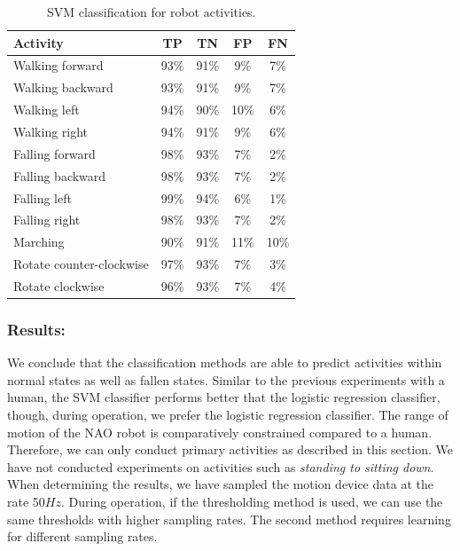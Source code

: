 \documentclass[letterpaper]{article}
\begin{document}
\begin{sloppy}
\begin{table}[!ht]
\caption{SVM classification for robot activities.}
	\label{tab:robot-svm-class}
	\centering
		\begin{tabular} {| l | c | c | c | c | }
		\hline
			{\bf Activity} & {\bf  TP}  &	{\bf TN}  &	{\bf FP} &	{\bf FN} \\ 
\hline
			Walking forward	& 93\%	& 91\%	& 9\%	& 7\% \\ \hline
			Walking backward	& 93\%	& 91\%	& 9\%	& 7\% \\ \hline
			Walking left	& 94\%	& 90\%	& 10\%	& 6\% \\ \hline
			Walking right	& 94\%	& 91\%	& 9\%	& 6\% \\ \hline
			Falling forward	& 98\%	& 93\%	& 7\%	& 2\%	 \\ \hline
			Falling backward	& 98\%	& 93\%	& 7\%	& 2\%	 \\ \hline
			Falling left	& 99\%	& 94\%	& 6\%	& 1\%	 \\ \hline
			Falling right	& 98\%	& 93\%	& 7\%	& 2\%	 \\ \hline
			Marching	& 90\%	& 91\%	& 11\%	& 10\%	 \\ \hline
			Rotate counter-clockwise	& 97\%	& 93\%	& 7\%	& 3\%	 \\ \hline
			Rotate clockwise	& 96\%	& 93\%	& 7\%	& 4\%	 \\ \hline
		\end{tabular}
\end{table}

\subsubsection{Results:} 
We conclude that the classification methods are able to predict activities within normal states 
as well as fallen states. Similar to the previous experiments with a human, the SVM classifier performs 
better that the logistic regression classifier, though, during operation, we prefer the logistic regression classifier. The range of motion of the NAO robot is comparatively constrained compared to a 
human. Therefore, we can only conduct primary activities as described in this section. We have not 
conducted experiments on activities such as \textit{standing to sitting down}. When determining the results, we 
have sampled the motion device data at the rate 50$Hz$. During operation, if the 
thresholding method is used, we can use the same thresholds with higher sampling rates. The second 
method requires learning for different sampling rates.



\end{sloppy}
\end{document}
